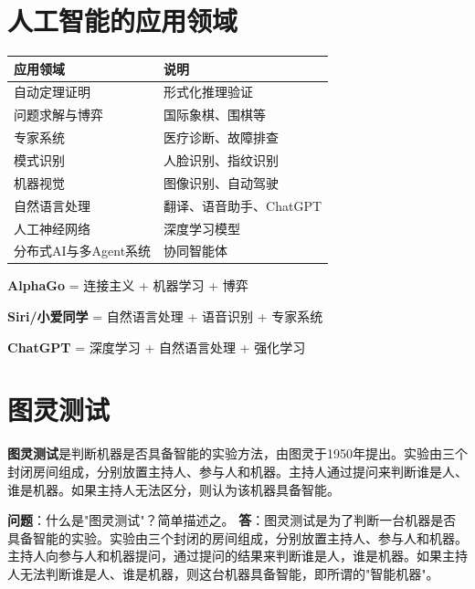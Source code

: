 \section{人工智能的应用领域}

\begin{table}[htbp]
\centering\small
\begin{tabular}{ll}
\toprule
\textbf{应用领域} & \textbf{说明} \\
\midrule
自动定理证明 & 形式化推理验证 \\
问题求解与博弈 & 国际象棋、围棋等 \\
专家系统 & 医疗诊断、故障排查 \\
模式识别 & 人脸识别、指纹识别 \\
机器视觉 & 图像识别、自动驾驶 \\
自然语言处理 & 翻译、语音助手、ChatGPT \\
人工神经网络 & 深度学习模型 \\
分布式AI与多Agent系统 & 协同智能体 \\
\bottomrule
\end{tabular}
\end{table}

\begin{examplebox}[案例分析]
\textbf{AlphaGo} = 连接主义 + 机器学习 + 博弈

\textbf{Siri/小爱同学} = 自然语言处理 + 语音识别 + 专家系统

\textbf{ChatGPT} = 深度学习 + 自然语言处理 + 强化学习
\end{examplebox}

\section{图灵测试}

\begin{conceptbox}
\textbf{图灵测试}是判断机器是否具备智能的实验方法，由图灵于1950年提出。实验由三个封闭房间组成，分别放置主持人、参与人和机器。主持人通过提问来判断谁是人、谁是机器。如果主持人无法区分，则认为该机器具备智能。
\end{conceptbox}

\begin{examplebox}[例题1.1 图灵测试]
\textbf{问题}：什么是"图灵测试"？简单描述之。
\tcblower
\textbf{答}：图灵测试是为了判断一台机器是否具备智能的实验。实验由三个封闭的房间组成，分别放置主持人、参与人和机器。主持人向参与人和机器提问，通过提问的结果来判断谁是人，谁是机器。如果主持人无法判断谁是人、谁是机器，则这台机器具备智能，即所谓的"智能机器"。
\end{examplebox}

